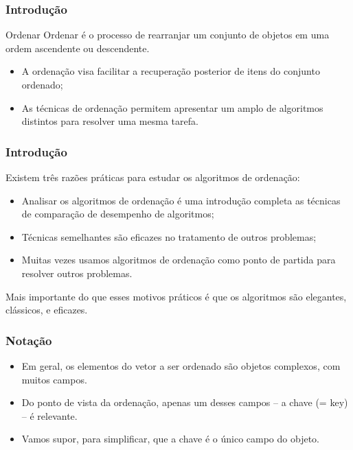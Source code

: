 \documentclass[aspectratio=169]{beamer}
\begin{document}
\begin{frame}
\frametitle{Introdução}
\begin{block}{Ordenar}
 Ordenar é o processo de rearranjar um conjunto de objetos em uma ordem ascendente ou descendente.
\end{block}
\begin{itemize}
\item A ordenação visa facilitar a recuperação posterior de itens do conjunto ordenado;
\item As técnicas de ordenação permitem apresentar um amplo de algoritmos distintos para resolver uma mesma tarefa.
\end{itemize}
\end{frame}

\begin{frame}
\frametitle{Introdução}
 Existem três razões práticas para estudar os algoritmos de ordenação:
\begin{itemize}
\item Analisar os algoritmos de ordenação é uma introdução completa as técnicas de comparação de desempenho de algoritmos;
\item Técnicas semelhantes são eficazes no tratamento de outros problemas;
\item Muitas vezes usamos algoritmos de ordenação como ponto de partida para resolver outros problemas.
\end{itemize}


Mais importante do que esses motivos práticos é que os algoritmos são elegantes, clássicos, e eficazes.
\end{frame}


\begin{frame}
\frametitle{Notação}
\begin{itemize}
\item Em geral, os elementos do vetor a ser ordenado são objetos complexos, com muitos campos.
\item Do ponto de vista da ordenação, apenas um desses campos -- a chave (= key) -- é relevante. 
\item Vamos supor, para simplificar, que a chave é o único campo do objeto. 
\end{itemize}
\end{frame}

\end{document}
